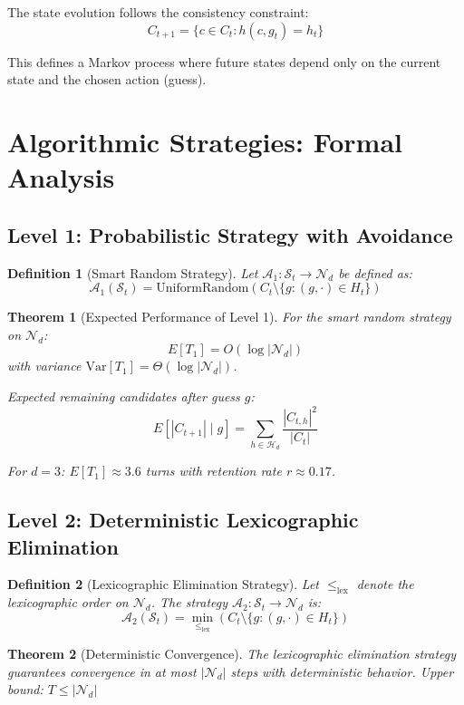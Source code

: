 \documentclass{article}
\newtheorem{definition}{Definition}
\newtheorem{theorem}{Theorem}
\begin{document}
The state evolution follows the consistency constraint:
$$C_{t+1} = \{c \in C_t : h(c, g_t) = h_t\}$$

This defines a Markov process where future states depend only on the current state and the chosen action (guess).

\section{Algorithmic Strategies: Formal Analysis}

\subsection{Level 1: Probabilistic Strategy with Avoidance}

\begin{definition}[Smart Random Strategy]
Let $\mathcal{A}_1: \mathcal{S}_t \rightarrow \mathcal{N}_d$ be defined as:
$$\mathcal{A}_1(\mathcal{S}_t) = \text{UniformRandom}(C_t \setminus \{g : (g, \cdot) \in H_t\})$$
\end{definition}

\begin{theorem}[Expected Performance of Level 1]
For the smart random strategy on $\mathcal{N}_d$:
$$E[T_1] = O(\log |\mathcal{N}_d|)$$
with variance $\text{Var}[T_1] = \Theta(\log |\mathcal{N}_d|)$.

Expected remaining candidates after guess $g$:
$$E[|C_{t+1}| \mid g] = \sum_{h \in \mathcal{H}_d} \frac{|C_{t,h}|^2}{|C_t|}$$

For $d=3$: $E[T_1] \approx 3.6$ turns with retention rate $r \approx 0.17$.
\end{theorem}

\subsection{Level 2: Deterministic Lexicographic Elimination}

\begin{definition}[Lexicographic Elimination Strategy]
Let $\leq_{\text{lex}}$ denote the lexicographic order on $\mathcal{N}_d$. The strategy $\mathcal{A}_2: \mathcal{S}_t \rightarrow \mathcal{N}_d$ is:
$$\mathcal{A}_2(\mathcal{S}_t) = \min_{\leq_{\text{lex}}} (C_t \setminus \{g : (g, \cdot) \in H_t\})$$
\end{definition}


\begin{theorem}[Deterministic Convergence]
The lexicographic elimination strategy guarantees convergence in at most $|\mathcal{N}_d|$ steps with deterministic behavior.
Upper bound: $T \leq |\mathcal{N}_d|$
\end{theorem}
\end{document}
